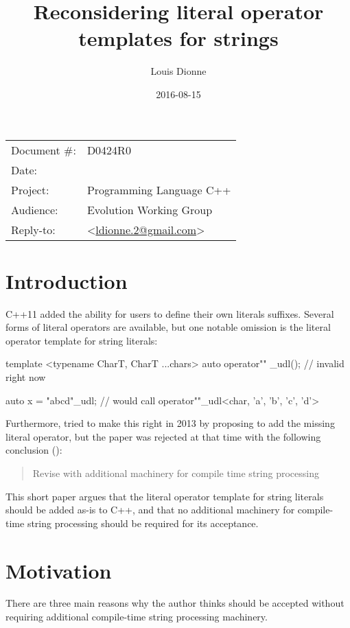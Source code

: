 \documentclass[11pt]{article}
\date{}
\title{Reconsidering literal operator templates for strings}
\author{}
\begin{document}
\maketitle\vspace{-2cm}

\begin{flushright}
  \begin{tabular}{ll}
  Document \#:&D0424R0\\
  Date:       &\date{2016-08-15}\\
  Project:    &Programming Language C++\\
  Audience:   &Evolution Working Group\\
  Reply-to:   &\author{Louis Dionne} \textless\href{mailto:ldionne.2@gmail.com}{ldionne.2@gmail.com}\textgreater
  \end{tabular}
\end{flushright}


\section{Introduction}
C++11 added the ability for users to define their own literals suffixes.
Several forms of literal operators are available, but one notable omission
is the literal operator template for string literals:

\begin{cpp}
template <typename CharT, CharT ...chars>
auto operator"" _udl(); // invalid right now

auto x = "abcd"_udl; // would call operator""_udl<char, 'a', 'b', 'c', 'd'>
\end{cpp}

Furthermore, \cite{N3599} tried to make this right in 2013 by proposing to add
the missing literal operator, but the paper was rejected at that time with
the following conclusion (\cite{CWG66}):

\begin{quote}
  Revise with additional machinery for compile time string processing
\end{quote}

This short paper argues that the literal operator template for string
literals should be added as-is to C++, and that no additional machinery
for compile-time string processing should be required for its acceptance.


\section{Motivation}
There are three main reasons why the author thinks \cite{N3599} should be
accepted without requiring additional compile-time string processing machinery.
\end{document}
